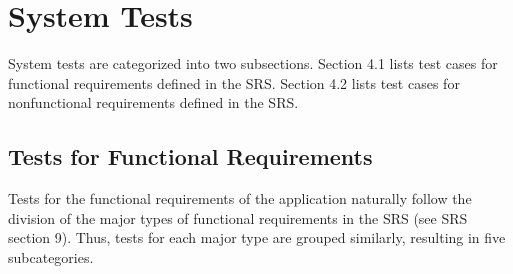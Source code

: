 \documentclass[12pt, titlepage]{article}
\begin{document}
\section{System Tests}

System tests are categorized into two subsections. Section 4.1 lists test cases for functional requirements defined in 
the SRS. Section 4.2 lists test cases for nonfunctional requirements defined in the SRS. 

\subsection{Tests for Functional Requirements}
Tests for the functional requirements of the application naturally follow the division of the major types of functional requirements
in the SRS (see SRS section 9). Thus, tests for each major type are grouped similarly, resulting in five subcategories.
\end{document}
